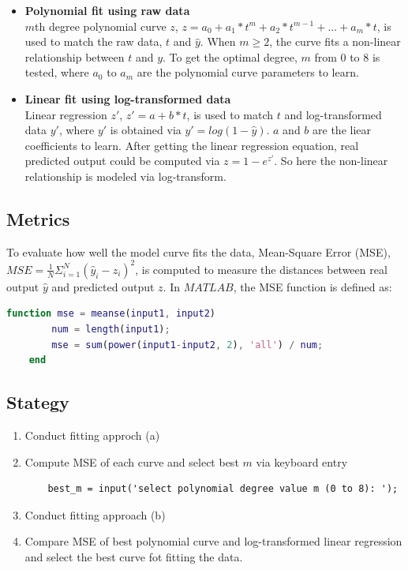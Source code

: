 \documentclass[11pt,a4paper,fleqn]{article}
\begin{document}
    \begin{itemize}
        \item \textbf{Polynomial fit using raw data}\\
        $m$th degree polynomial curve $z$, $z=a_0+a_1*t^m+a_2*t^{m-1}+...+a_m*t$, is used to match the raw data, $t$ and $\hat y$. When $m \ge 2$, the curve fits a non-linear relationship between $t$ and $y$. To get the optimal degree, $m$ from 0 to 8 is tested, where $a_0$ to $a_m$ are the polynomial curve parameters to learn. 

        \item \textbf{Linear fit using log-transformed data}\\
        Linear regression $z'$, $z'=a+b*t$, is used to match $t$ and log-transformed data $y'$, where $y'$ is obtained via $y'=log(1-\hat y)$. $a$ and $b$ are the liear coefficients to learn. After getting the linear regression equation, real predicted output could be computed via $z=1-e^{z'}$. So here the non-linear relationship is modeled via log-transform. 
    \end{itemize} 

    \subsection{Metrics}
    To evaluate how well the model curve fits the data, Mean-Square Error (MSE), $MSE=\frac{1}{N}\Sigma_{i=1}^{N}(\hat y_i - z_i)^2$, is computed to measure the distances between real output $\hat y$ and predicted output $z$. In $MATLAB$, the MSE function is defined as: 

    \begin{lstlisting}[language=matlab]
    function mse = meanse(input1, input2)
        num = length(input1);
        mse = sum(power(input1-input2, 2), 'all') / num;
    end
    \end{lstlisting}
    \vspace{-0.3cm}

    \subsection{Stategy}
    \begin{enumerate}
    \item Conduct fitting approch (a)
    \item Compute MSE of each curve and select best $m$ via keyboard entry
    \begin{lstlisting}
    best_m = input('select polynomial degree value m (0 to 8): ');
    \end{lstlisting}
    \vspace{-0.3cm}
    \item Conduct fitting approach (b)
    \item Compare MSE of best polynomial curve and log-transformed linear regression and select the best curve fot fitting the data. 
    \end{enumerate}
\end{document}
